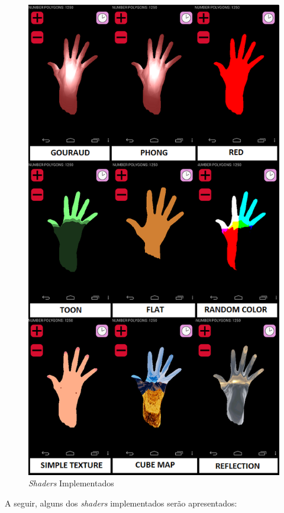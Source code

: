 	\begin{figure}[ht]
	\centering
		\includegraphics[keepaspectratio=true,scale=0.7]{figuras/shaders_impl.png}
	\caption{\textit{Shaders} Implementados}
	\label{shaders_impl}
	\end{figure}

	A seguir, alguns dos \textit{shaders} implementados serão apresentados:

